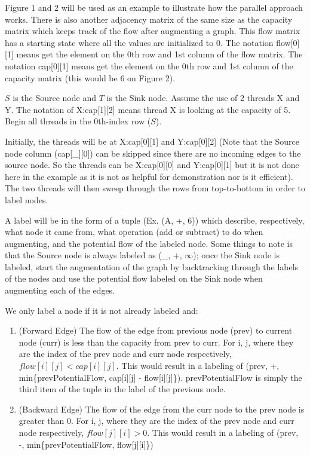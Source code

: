         Figure 1 and 2 will be used as an example to illustrate how the parallel approach works. There is also another adjacency matrix of the same size as the capacity matrix which keeps track of the flow after augmenting a graph. This flow matrix has a starting state where all the values are initialized to 0. The notation flow[0][1] means get the element on the 0th row and 1st column of the flow matrix. The notation cap[0][1] means get the element on the 0th row and 1st column of the capacity matrix (this would be 6 on Figure 2).
        
        
        
        $S$ is the Source node and $T$ is the Sink node. Assume the use of 2 threads X and Y. The notation of X:cap[1][2] means thread X is looking at the capacity of 5. Begin all threads in the 0th-index row ($S$).
        
        
        Initially, the threads will be at X:cap[0][1] and Y:cap[0][2] (Note that the Source node column (cap[\_][0]) can be skipped since there are no incoming edges to the source node. So the threads can be X:cap[0][0] and Y:cap[0][1] but it is not done here in the example as it is not as helpful for demonstration nor is it efficient). The two threads will then sweep through the rows from top-to-bottom in order to label nodes.
        
        A label will be in the form of a tuple (Ex. (A, +, 6)) which describe, respectively, what node it came from, what operation (add or subtract) to do when augmenting, and the potential flow of the labeled node. Some things to note is that the Source node is always labeled as (\_, +, $\infty$); once the Sink node is labeled, start the augmentation of the graph by backtracking through the labels of the nodes and use the potential flow labeled on the Sink node when augmenting each of the edges.
        
        We only label a node if it is not already labeled and:
        \begin{enumerate}
            \item (Forward Edge) The flow of the edge from previous node (prev) to current node (curr) is less than the capacity from prev to curr.\newline
            For i, j, where they are the index of the prev node and curr node respectively, $flow[i][j] < cap[i][j]$. This would result in a labeling of (prev, +, min\{prevPotentialFlow, cap[i][j] - flow[i][j]\}). prevPotentialFlow is simply the third item of the tuple in the label of the previous node.
            \item (Backward Edge) The flow of the edge from the curr node to the prev node is greater than 0.\newline
            For i, j, where they are the index of the prev node and curr node respectively, $flow[j][i] > 0$. This would result in a labeling of (prev, -, min\{prevPotentialFlow, flow[j][i]\})
        \end{enumerate}
        
